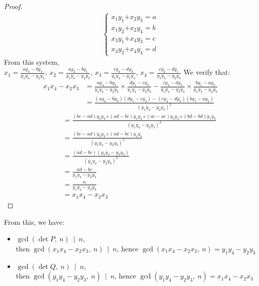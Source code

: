 \documentclass[sigconf,balance=false]{acmart}
\begin{document}
\begin{proof}
\begin{eqnarray}
	\left\lbrace
	\begin{array}{ll}
	x_{1}y_{1} \text{+} x_{2}y_{3}=a\\
	x_{1}y_{2} \text{+} x_{2}y_{4}=b\\
	x_{3}y_{1} \text{+} x_{4}y_{3}=c\\
	x_{3}y_{2} \text{+} x_{4}y_{4}=d
	\end{array} \right.
\end{eqnarray}
From this system,\\
$\displaystyle x_{1}=\frac{ay_{4}-by_{3}}{y_{1}y_{4}-y_{2}y_{3}}$, $\displaystyle x_{2}=\frac{ay_{2}-by_{1}}{y_{1}y_{4}-y_{2}y_{3}}$, $\displaystyle x_{3}=\displaystyle\frac{cy_{4}-dy_{3}}{y_{1}y_{4}-y_{1}y_{4}}$, $x_{4}=\displaystyle\frac{cy_{2}-dy_{1}}{y_{1}y_{4}-y_{2}y_{3}}$
We verify that:
\begin{align*}
x_{1}x_{4}-x_{2}x_{3}&=\displaystyle\frac{ay_{4}-by_{3}}{y_{1}y_{4}-y_{2}y_{3}} \times \frac{dy_{1}-cy_{2}}{y_{1}y_{4}-y_{2}y_{3}}-\frac{cy_{4}-dy_{3}}{y_{1}y_{4}-y_{2}y_{3}}\times \frac{by_{1}-ay_{2}}{y_{1}y_{4}-y_{2}y_{3}}\\
&=\frac{\left(ay_{4}-by_{3}\right)\left(dy_{1}-cy_{2}\right)-\left(cy_{4}-dy_{3}\right)\left(by_{1}-ay_{2}\right)}{\left(y_{1}y_{4}-y_{2}y_{3}\right)^{2}}
\end{align*}
\begin{align*}
\ \ \ \ \ \ \ \ &=\displaystyle\frac{\left(bc-ad\right)y_{2}y_{3}\text{+}\left(ad-bc\right)y_{1}y_{4}\text{+}\left(ac-ac\right)y_{2}y_{4}\text{+}\left(bd-bd\right)y_{1}y_{3}}{\left(y_{1}y_{4}-y_{2}y_{3}\right)^{2}}\\
&=\displaystyle\frac{\left(bc-ad\right)y_{2}y_{3}\text{+}\left(ad-bc\right)y_{1}y_{4}}{\left(y_{1}y_{4}-y_{2}y_{3}\right)^{2}}\\
&=\displaystyle\frac{\left(ad-bc\right)\left(y_{1}y_{4}-y_{2}y_{3}\right)}{\left(y_{1}y_{4}-y_{2}y_{3}\right)^{2}}\\
&=\displaystyle\frac{ad-bc}{y_{1}y_{4}-y_{2}y_{3}}\\
&=\displaystyle\frac{n}{y_{1}y_{4}-y_{2}y_{3}}\\
&=x_{1}x_{4}-x_{2}x_{3}
\end{align*}
\end{proof}
From this, we have:
\begin{itemize}
\item $\displaystyle\gcd\left(\det P, \ n\right) \ \mid \ n$,\\
then $ \gcd\left(x_{1}x_{4}-x_{2}x_{3}, \ n \right) \ \mid \ n$, hence $\gcd\left(x_{1}x_{4}-x_{2}x_{3}, \ n \right)=y_{1}y_{4}-y_{2}y_{3}$\\
\item $\displaystyle\gcd\left(\det Q, \ n\right) \ \mid \ n$,\\
then $ \gcd\left(y_{1}y_{4}-y_{2}y_{3}, \ n \right) \ \mid \ n$, hence $\gcd\left(y_{1}y_{4}-y_{2}y_{3}, \ n \right)=x_{1}x_{4}-x_{2}x_{3}$
\end{itemize}
\end{document}
